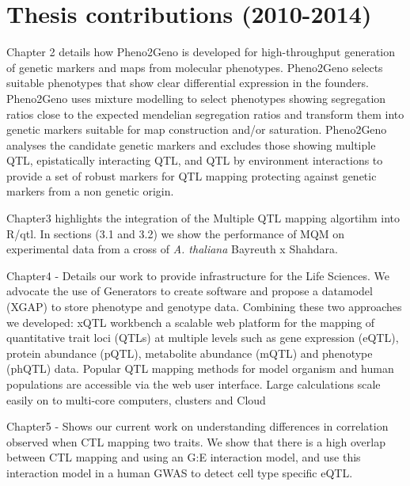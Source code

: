 \section{Thesis contributions (2010-2014)}
Chapter 2 details how Pheno2Geno is developed for high-throughput generation of genetic markers and maps from 
molecular phenotypes. Pheno2Geno selects suitable phenotypes that show clear differential expression 
in the founders. Pheno2Geno uses mixture modelling to select phenotypes showing segregation ratios 
close to the expected mendelian segregation ratios and transform them into genetic markers suitable 
for map construction and/or saturation. Pheno2Geno analyses the candidate genetic markers and excludes 
those showing multiple QTL, epistatically interacting QTL, and QTL by environment interactions to 
provide a set of robust markers for QTL mapping protecting against genetic markers from a non genetic 
origin.

Chapter3 highlights the integration of the Multiple QTL mapping algortihm into R/qtl. In sections 
(3.1 and 3.2) we show the performance of MQM on experimental data from a cross of \emph{A. thaliana} 
Bayreuth x Shahdara.

Chapter4 - Details our work to provide infrastructure for the Life Sciences. We advocate the 
use of Generators to create software and propose a datamodel (XGAP) to store phenotype and 
genotype data. Combining these two approaches we developed: xQTL workbench a scalable web 
platform for the mapping of quantitative trait loci (QTLs) at multiple levels such as gene 
expression (eQTL), protein abundance (pQTL), metabolite abundance (mQTL) and phenotype (phQTL) data. 
Popular QTL mapping methods for model organism and human populations are accessible via the web 
user interface. Large calculations scale easily on to multi-core computers, clusters and Cloud

Chapter5 -  Shows our current work on understanding differences in correlation observed when 
CTL mapping two traits. We show that there is a high overlap between CTL mapping and using an 
G:E interaction model, and use this interaction model in a human GWAS to detect cell type 
specific eQTL.

